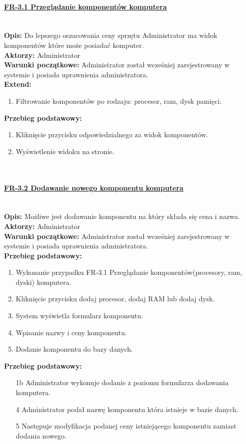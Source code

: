 \paragraph{\underline{FR-3.1 Przeglądanie komponentów komputera}}\mbox{}\\[1mm]
	\noindent\textbf{Opis:} Do lepszego oszacowania ceny sprzętu Administrator ma widok komponentów które może posiadać komputer.\\
	\noindent\textbf{Aktorzy:} Administrator\\
	\textbf{Warunki początkowe:} Administrator został wcześniej zarejestrowany w systemie i posiada uprawnienia administratora.\\
	\textbf{Extend:}
    \begin{enumerate}[noparskip]
		\item Filtrowanie komponentów po rodzaju: procesor, ram, dysk pamięci.
	\end{enumerate}
  \textbf{Przebieg podstawowy:}
	\begin{enumerate}[noparskip]
		\item Kliknięcie przycisku odpowiedzialnego za widok komponentów.
		\item Wyświetlenie widoku na stronie.
  \end{enumerate} \mbox{}\\[-11mm]

\paragraph{\underline{FR-3.2 Dodawanie nowego komponentu komputera}}\mbox{}\\[1mm]
	\noindent\textbf{Opis:} Możliwe jest dodawanie komponentu na który składa się cena i nazwa.\\
	\noindent\textbf{Aktorzy:} Administrator\\
	\textbf{Warunki początkowe:} Administrator został wcześniej zarejestrowany w systemie i posiada uprawnienia administratora.\\
  \textbf{Przebieg podstawowy:}
  \begin{enumerate}[noparskip]
		\item Wykonanie przypadku FR-3.1 Przeglądanie komponentów(procesory, ram, dyski) komputera.
		\item Kliknięcie przycisku dodaj procesor, dodaj RAM lub dodaj dysk.
		\item System wyświetla formularz komponentu.
		\item Wpisanie nazwy i ceny komponentu.
		\item Dodanie komponentu do bazy danych.
  \end{enumerate}
  \textbf{Przebieg podstawowy:}
  \begin{enumerate}[noparskip]
		\item[1b] Administrator wykonuje dodanie z poziomu formularza dodawania komputera.
		\item[4] Administrator podał nazwę komponentu która istnieje w bazie danych.
		\item[5] Następuje modyfikacja podanej ceny istniejącego komponentu zamiast dodania nowego.
  \end{enumerate} \mbox{}\\[-11mm]

